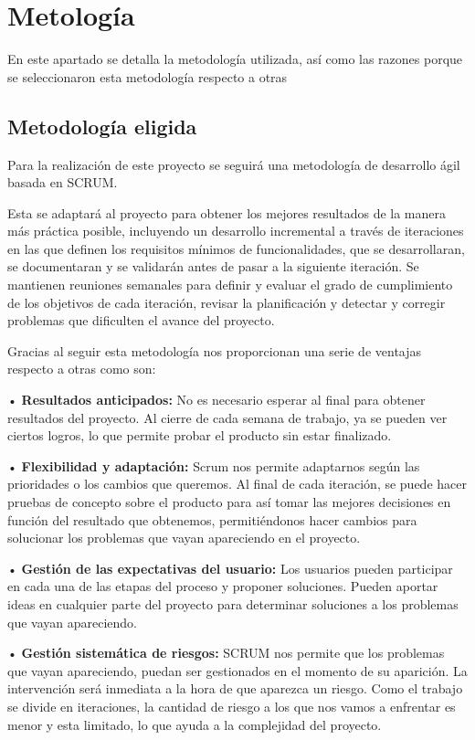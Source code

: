 \chapter{Metología}

En este apartado se detalla la metodología utilizada, así como las razones porque se seleccionaron esta metodología respecto a otras


\section{Metodología eligida}

Para la realización de este proyecto se seguirá una metodología de desarrollo ágil basada en SCRUM.

Esta se adaptará al proyecto para obtener los mejores resultados de la manera más práctica posible, incluyendo un desarrollo incremental a través de iteraciones en las que definen los requisitos mínimos de funcionalidades, que se desarrollaran, se documentaran y se validarán antes de pasar a la siguiente iteración. Se mantienen reuniones semanales para definir y evaluar el grado de cumplimiento de los objetivos de cada iteración, revisar la planificación y detectar y corregir problemas que dificulten el avance del proyecto.

Gracias al seguir esta metodología nos proporcionan una serie de ventajas respecto a otras como son:

• \textbf{Resultados anticipados:} No es necesario esperar al final para obtener resultados del proyecto. Al cierre de cada semana de trabajo, ya se pueden ver ciertos logros, lo que permite probar el producto sin estar finalizado.

• \textbf{Flexibilidad y adaptación:} Scrum nos permite adaptarnos según las prioridades o los cambios que queremos.  Al final de cada iteración, se puede hacer pruebas de concepto sobre el producto para así tomar las mejores decisiones en función del resultado que obtenemos, permitiéndonos hacer cambios para solucionar los problemas que vayan apareciendo en el proyecto.

• \textbf{Gestión de las expectativas del usuario:} Los usuarios pueden participar en cada una de las etapas del proceso y proponer soluciones.  Pueden aportar ideas en cualquier parte del proyecto para determinar soluciones a los problemas que vayan apareciendo.

• \textbf{Gestión sistemática de riesgos:} SCRUM nos permite que los problemas que vayan apareciendo, puedan ser gestionados en el momento de su aparición. La intervención será inmediata a la hora de que aparezca un riesgo. Como el trabajo se divide en iteraciones, la cantidad de riesgo a los que nos vamos a enfrentar es menor y esta limitado, lo que ayuda a la complejidad del proyecto.

